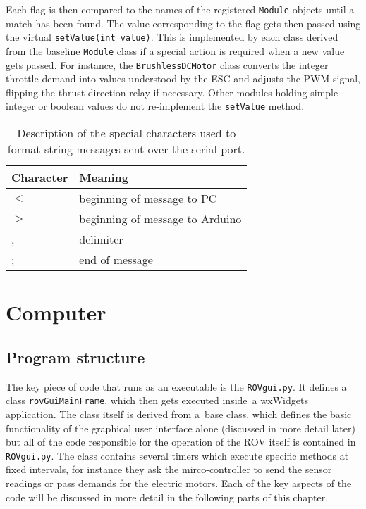 Each flag is then compared to the names of the registered \texttt{Module} objects until a match has been found. The value corresponding to the flag gets then passed using the virtual \texttt{setValue(int value)}. This is implemented by each class derived from the baseline \texttt{Module} class if a special action is required when a new value gets passed. For instance, the \texttt{BrushlessDCMotor} class converts the integer throttle demand into values understood by the ESC and adjusts the PWM signal, flipping the thrust direction relay if necessary. Other modules holding simple integer or boolean values do not re-implement the \texttt{setValue} method.

\begin{table}[h]
\centering
\caption{Description of the special characters used to format string messages sent over the serial port.}
\label{tab:commsEncoding}
\begin{tabular}{@{}ll@{}}
\toprule
\textbf{Character} & \textbf{Meaning} \\ \midrule
$<$ & beginning of message to PC \\
$>$ & beginning of message to Arduino \\
, & delimiter \\
; & end of message \\
\bottomrule
\end{tabular}
\end{table}

\section{Computer}

\subsection{Program structure}
The key piece of code that runs as an executable is the \texttt{ROVgui.py}. It
defines a class \texttt{rovGuiMainFrame}, which then gets executed inside~a 
wxWidgets application. The class itself is derived from a~base class, which
defines the basic functionality of the graphical user interface alone (discussed
in more detail later) but all of the code responsible for the operation of the
ROV itself is contained in \texttt{ROVgui.py}.
The class contains several timers which execute specific methods at fixed intervals,
for instance they ask the mirco-controller to send the sensor readings or pass
demands for the electric motors.
Each of the key aspects of the code will be discussed in more detail in the following
parts of this chapter.

